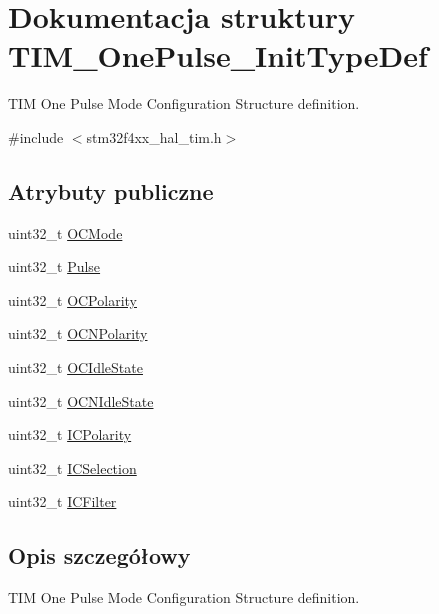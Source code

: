 \hypertarget{struct_t_i_m___one_pulse___init_type_def}{}\section{Dokumentacja struktury T\+I\+M\+\_\+\+One\+Pulse\+\_\+\+Init\+Type\+Def}
\label{struct_t_i_m___one_pulse___init_type_def}


T\+IM One Pulse Mode Configuration Structure definition.  




{\ttfamily \#include $<$stm32f4xx\+\_\+hal\+\_\+tim.\+h$>$}

\subsection*{Atrybuty publiczne}
\begin{DoxyCompactItemize}
\item 
uint32\+\_\+t \hyperlink{struct_t_i_m___one_pulse___init_type_def_af127f01162853e39ae616b43cc52b674}{O\+C\+Mode}
\item 
uint32\+\_\+t \hyperlink{struct_t_i_m___one_pulse___init_type_def_a4f1fbf6d60812c3194e9ee8a05f5cfa6}{Pulse}
\item 
uint32\+\_\+t \hyperlink{struct_t_i_m___one_pulse___init_type_def_a3028787ad41698072cbf70ddf1b6c984}{O\+C\+Polarity}
\item 
uint32\+\_\+t \hyperlink{struct_t_i_m___one_pulse___init_type_def_a00deac6c3347b0482955d936351c6388}{O\+C\+N\+Polarity}
\item 
uint32\+\_\+t \hyperlink{struct_t_i_m___one_pulse___init_type_def_aef11bcea1dbf3e3ddf2a4bbc2846bb1e}{O\+C\+Idle\+State}
\item 
uint32\+\_\+t \hyperlink{struct_t_i_m___one_pulse___init_type_def_a37bc0a680d53458bf4c42ebb277b0c2c}{O\+C\+N\+Idle\+State}
\item 
uint32\+\_\+t \hyperlink{struct_t_i_m___one_pulse___init_type_def_a8589cf95218ea62604b845054b36b772}{I\+C\+Polarity}
\item 
uint32\+\_\+t \hyperlink{struct_t_i_m___one_pulse___init_type_def_a9e8853f17e85393a869aa2ecb315f030}{I\+C\+Selection}
\item 
uint32\+\_\+t \hyperlink{struct_t_i_m___one_pulse___init_type_def_a883e69dec14d8bde9914906be1b04ad7}{I\+C\+Filter}
\end{DoxyCompactItemize}


\subsection{Opis szczegółowy}
T\+IM One Pulse Mode Configuration Structure definition. 

